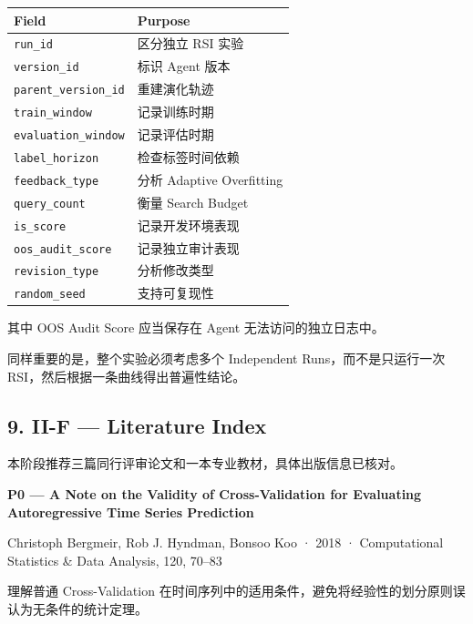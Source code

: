 \begin{readertable}
\begin{longtable}[]{@{}
  >{\raggedright\arraybackslash}p{}
  >{\raggedright\arraybackslash}p{}@{}}
\toprule
Field & Purpose \\
\midrule
\endhead
\texttt{run\_id} & 区分独立 RSI 实验 \\
\texttt{version\_id} & 标识 Agent 版本 \\
\texttt{parent\_version\_id} & 重建演化轨迹 \\
\texttt{train\_window} & 记录训练时期 \\
\texttt{evaluation\_window} & 记录评估时期 \\
\texttt{label\_horizon} & 检查标签时间依赖 \\
\texttt{feedback\_type} & 分析 Adaptive Overfitting \\
\texttt{query\_count} & 衡量 Search Budget \\
\texttt{is\_score} & 记录开发环境表现 \\
\texttt{oos\_audit\_score} & 记录独立审计表现 \\
\texttt{revision\_type} & 分析修改类型 \\
\texttt{random\_seed} & 支持可复现性 \\
\bottomrule
\end{longtable}
\end{readertable}

其中 OOS Audit Score 应当保存在 Agent 无法访问的独立日志中。

同样重要的是，整个实验必须考虑多个 Independent Runs，而不是只运行一次 RSI，然后根据一条曲线得出普遍性结论。

\hypertarget{part-2-27-0001-ii-f-literature-index}{%
\subsection{9. II-F --- Literature Index}\label{part-2-27-0001-ii-f-literature-index}}

本阶段推荐三篇同行评审论文和一本专业教材，具体出版信息已核对。

\textbf{P0 --- A Note on the Validity of Cross-Validation for Evaluating Autoregressive Time Series Prediction}

Christoph Bergmeir, Rob J. Hyndman, Bonsoo Koo · 2018 · Computational Statistics \& Data Analysis, 120, 70--83

理解普通 Cross-Validation 在时间序列中的适用条件，避免将经验性的划分原则误认为无条件的统计定理。

